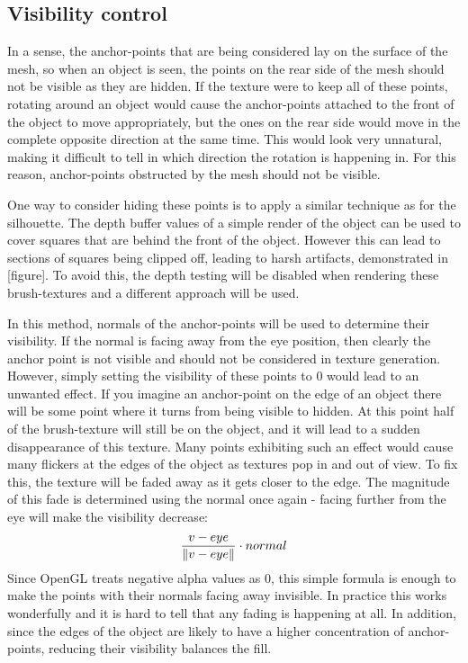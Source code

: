 \documentclass[a4paper, 12pt]{article}
\DeclarePairedDelimiter{\norm}{\lVert}{\rVert}
\begin{document}
\subsection{Visibility control}
In a sense, the anchor-points that are being considered lay on the surface of the mesh, so when an object is seen, the points on the rear side of the mesh should not be visible as they are hidden. If the texture were to keep all of these points, rotating around an object would cause the anchor-points attached to the front of the object to move appropriately, but the ones on the rear side would move in the complete opposite direction at the same time. This would look very unnatural, making it difficult to tell in which direction the rotation is happening in. For this reason, anchor-points obstructed by the mesh should not be visible.

One way to consider hiding these points is to apply a similar technique as for the silhouette. The depth buffer values of a simple render of the object can be used to cover squares that are behind the front of the object. However this can lead to sections of squares being clipped off, leading to harsh artifacts, demonstrated in [figure]. To avoid this, the depth testing will be disabled when rendering these brush-textures and a different approach will be used.

In this method, normals of the anchor-points will be used to determine their visibility. If the normal is facing away from the eye position, then clearly the anchor point is not visible and should not be considered in texture generation. However, simply setting the visibility of these points to 0 would lead to an unwanted effect. If you imagine an anchor-point on the edge of an object there will be some point where it turns from being visible to hidden. At this point half of the brush-texture will still be on the object, and it will lead to a sudden disappearance of this texture. Many points exhibiting such an effect would cause many flickers at the edges of the object as textures pop in and out of view. To fix this, the texture will be faded away as it gets closer to the edge. The magnitude of this fade is determined using the normal once again - facing further from the eye will make the visibility decrease:
$$\frac{v-eye}{\norm{v-eye}} \cdot normal$$
Since OpenGL treats negative alpha values as 0, this simple formula is enough to make the points with their normals facing away invisible. In practice this works wonderfully and it is hard to tell that any fading is happening at all. In addition, since the edges of the object are likely to have a higher concentration of anchor-points, reducing their visibility balances the fill.
\end{document}

